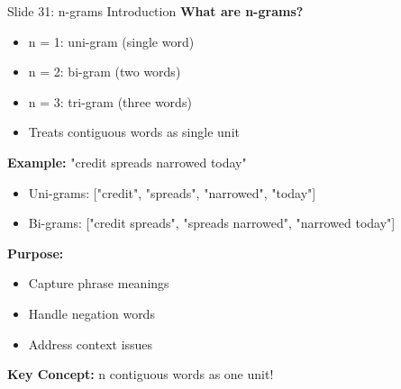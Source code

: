\documentclass[8pt]{beamer}
\begin{document}
	\begin{frame}{Slide 31: n-grams Introduction}
		\fontsize{6.5}{7.5}\selectfont
		\textbf{What are n-grams?}
		\begin{itemize}
			\item n = 1: uni-gram (single word)
			\item n = 2: bi-gram (two words)
			\item n = 3: tri-gram (three words)
			\item Treats contiguous words as single unit
		\end{itemize}
		
		\vspace{0.1cm}
		\textbf{Example:}
		"credit spreads narrowed today"
		\begin{itemize}
			\item Uni-grams: ["credit", "spreads", "narrowed", "today"]
			\item Bi-grams: ["credit spreads", "spreads narrowed", "narrowed today"]
		\end{itemize}
		
		\vspace{0.1cm}
		\textbf{Purpose:}
		\begin{itemize}
			\item Capture phrase meanings
			\item Handle negation words
			\item Address context issues
		\end{itemize}
		
		\textcolor{myblue}{\textbf{Key Concept:}} n contiguous words as one unit!
	\end{frame}
	
\end{document}
